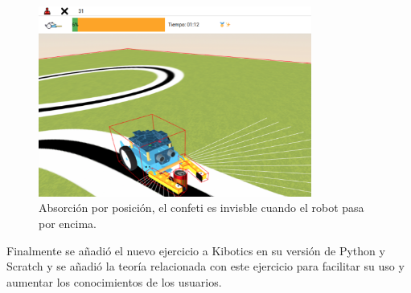  \begin{figure}[H]
  \centering
 \includegraphics[width=0.8\textwidth, height=0.5\textwidth]{chapters/images/evaluadorpinza.png}
  \caption{Absorción por posición, el confeti es invisble cuando el robot pasa por encima.}
\end{figure}
Finalmente se añadió el nuevo ejercicio a Kibotics en su versión de Python y Scratch y se añadió la teoría relacionada con este ejercicio para facilitar su uso y aumentar los conocimientos de los usuarios.


